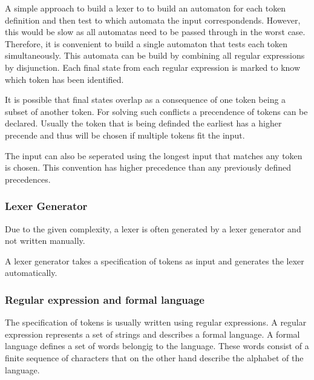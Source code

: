 A simple approach to build a lexer to to build an automaton for each token definition and then test to which automata the input correspondends.
However, this would be slow as all automatas need to be passed through in the worst case.
Therefore, it is convenient to build a single automaton that tests each token simultaneously.
This automata can be build by combining all regular expressions by disjunction.
Each final state from each regular expression is marked to know which token has been identified.

It is possible that final states overlap as a consequence of one token being a subset of another token.
For solving such conflicts a precendence of tokens can be declared. Usually the token that is being definded the earliest has a higher precende and thus will be chosen if multiple tokens fit the input. \cite{Mogensen.2017}

The input can also be seperated using the longest input that matches any token is chosen. \cite{Mogensen.2017}
This convention has higher precedence than any previously defined precedences.

\subsubsection{Lexer Generator}

Due to the given complexity, a lexer is often generated by a lexer generator and not written manually.

A lexer generator takes a specification of tokens as input and generates the lexer automatically. 

\subsubsection{Regular expression and formal language}\label{BackgroundRegExp}

The specification of tokens is usually written using regular expressions. 
A regular expression represents a set of strings and describes a formal language. 
A formal language defines a set of words belongig to the language.
These words consist of a finite sequence of characters that on the other hand describe the alphabet of the language.




